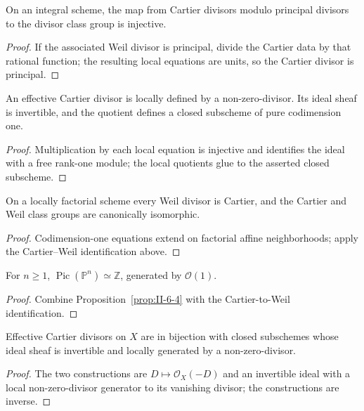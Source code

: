 \begin{corollary}
\label{cor:II-6-14}
On an integral scheme, the map from Cartier divisors modulo principal divisors to the divisor class
group is injective.
\end{corollary}
\begin{proof}
If the associated Weil divisor is principal, divide the Cartier data by that rational function; the
resulting local equations are units, so the Cartier divisor is principal.
\end{proof}

\begin{proposition}
\label{prop:II-6-15}
An effective Cartier divisor is locally defined by a non-zero-divisor. Its ideal sheaf is invertible,
and the quotient defines a closed subscheme of pure codimension one.
\end{proposition}
\begin{proof}
Multiplication by each local equation is injective and identifies the ideal with a free rank-one
module; the local quotients glue to the asserted closed subscheme.
\end{proof}

\begin{corollary}
\label{cor:II-6-16}
On a locally factorial scheme every Weil divisor is Cartier, and the Cartier and Weil class groups
are canonically isomorphic.
\end{corollary}
\begin{proof}
Codimension-one equations extend on factorial affine neighborhoods; apply the Cartier--Weil
identification above.
\end{proof}

\begin{corollary}
\label{cor:II-6-17}
For $n\geq1$, $\operatorname{Pic}(\mathbb P^n)\simeq\mathbb Z$, generated by $\mathcal O(1)$.
\end{corollary}
\begin{proof}
Combine Proposition~\ref{prop:II-6-4} with the Cartier-to-Weil identification.
\end{proof}

\begin{proposition}
\label{prop:II-6-18}
Effective Cartier divisors on $X$ are in bijection with closed subschemes whose ideal sheaf is
invertible and locally generated by a non-zero-divisor.
\end{proposition}
\begin{proof}
The two constructions are $D\mapsto\mathcal O_X(-D)$ and an invertible ideal with a local
non-zero-divisor generator to its vanishing divisor; the constructions are inverse.
\end{proof}

